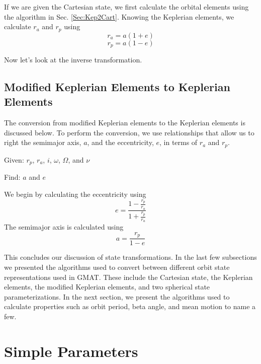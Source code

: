 If we are given the Cartesian state, we first calculate the
orbital elements using the algorithm in Sec. \ref{Sec:Kep2Cart}.
Knowing the Keplerian elements, we calculate $r_a$ and $r_p$ using
%
\begin{equation}
     r_a = a(1+e)
\end{equation}
%
\begin{equation}
     r_p = a(1-e)
\end{equation}

Now let's look at the inverse transformation.

\subsection{Modified Keplerian Elements to Keplerian Elements}    

The conversion from modified Keplerian elements to the Keplerian
elements is discussed below.  To perform the conversion, we use
relationships that allow us to right the semimajor axis, $a$, and
the eccentricity, $e$, in terms of $r_a$ and $r_p$.

\noindent Given:  $r_p$, $r_a$, $i$, $\omega$, $\Omega$, and $\nu$

\noindent Find:  $a$ and $e$

We begin by calculating the eccentricity using
%
\begin{equation}
    e = \frac{1 - \displaystyle\frac{r_p}{r_a}}{1 + \displaystyle\frac{r_p}{r_a}}
\end{equation}
%
The semimajor axis is calculated using
%
\begin{equation}
    a = \displaystyle\frac{r_p}{1 - e}
\end{equation}

This concludes our discussion of state transformations. In the
last few subsections we presented the algorithms used to convert
between different orbit state representations used in GMAT.  These
include the Cartesian state, the Keplerian elements, the modified
Keplerian elements, and two spherical state parameterizations.  In
the next section, we present the algorithms used to calculate
 properties such as orbit period, beta angle, and mean motion to
 name a few.

\section{Simple Parameters}

